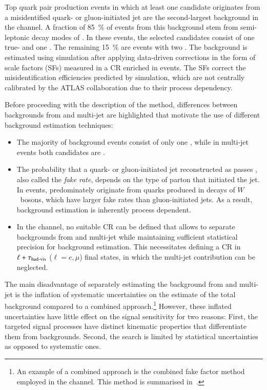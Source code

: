 Top quark pair production events in which at least one \tauhadvis candidate
originates from a misidentified quark- or gluon-initiated jet are the
second-largest background in the \hadhad channel. A fraction of
\SI{85}{\percent} of events from this background stem from semi-leptonic decay
modes of \ttbar. In these events, the selected \tauhadvis candidates consist of
one true- and one \faketauhadvis. The remaining \SI{15}{\percent} are
\ttbarFakes events with two \faketauhadvis.
The \ttbarFakes background is estimated using simulation after applying
data-driven corrections in the form of \faketauhadvis scale factors (SFs)
measured in a CR enriched in \ttbar events. The SFs correct the \jettotauhadvis
misidentification efficiencies predicted by simulation, which are not centrally
calibrated by the ATLAS collaboration due to their process dependency.

Before proceeding with the description of the method, differences between
\faketauhadvis backgrounds from \ttbar and multi-jet are highlighted that
motivate the use of different background estimation techniques:
\begin{itemize}

\item The majority of \ttbarFakes background events consist of only one
  \faketauhadvis, while in multi-jet events both candidates are \faketauhadvis.

\item The probability that a quark- or gluon-initiated jet reconstructed as
  \tauhadvis passes \tauid, also called the \emph{fake rate}, depends on the
  type of parton that initiated the jet. In \ttbar events, \faketauhadvis
  predominately originate from quarks produced in decays of $W$~bosons, which
  have larger fake rates than gluon-initiated jets. As a result, \faketauhadvis
  background estimation is inherently process dependent.

\item In the \hadhad channel, no suitable \ttbarFakes CR can be defined that
  allows to separate \faketauhadvis backgrounds from \ttbar and multi-jet while
  maintaining sufficient statistical precision for background estimation. This
  necessitates defining a CR in $\ell + \tau_{\text{had-vis}}$ ($\ell = e, \mu$) final
  states, in which the multi-jet contribution can be neglected.

\end{itemize}
The main disadvantage of separately estimating the \faketauhadvis background
from \ttbar and multi-jet is the inflation of systematic uncertainties on the
estimate of the total \faketauhadvis background compared to a combined
approach.\footnote{An example of a combined approach is the combined fake factor
  method employed in the \lephad channel. This method is summarised
  in~.}  However, these inflated uncertainties
have little effect on the signal sensitivity for two reasons: First, the
targeted signal processes have distinct kinematic properties that differentiate
them from \faketauhadvis backgrounds. Second, the search is limited by
statistical uncertainties as opposed to systematic ones.


